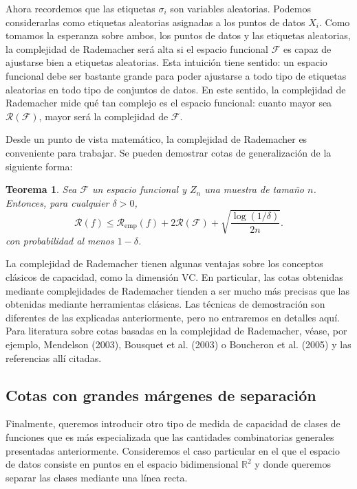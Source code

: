 \documentclass{report}
\newtheorem{thm}{Teorema}[subsection]
\begin{document}
Ahora recordemos que las etiquetas \(\sigma_i\) son variables aleatorias. Podemos considerarlas 
como etiquetas aleatorias asignadas a los puntos de datos \(X_i\). Como tomamos la esperanza sobre ambos, los 
puntos de datos y las etiquetas aleatorias, la complejidad de Rademacher será alta si el espacio funcional 
\(\mathcal{F}\) es capaz de ajustarse bien a etiquetas aleatorias. Esta intuición tiene sentido: un espacio 
funcional debe ser bastante grande para poder ajustarse a todo tipo de etiquetas aleatorias en todo tipo de 
conjuntos de datos. En este sentido, la complejidad de Rademacher mide qué tan complejo es el espacio 
funcional: cuanto mayor sea \(\mathscr{R}(\mathcal{F})\), mayor será la complejidad de \(\mathcal{F}\).\newline

Desde un punto de vista matemático, la complejidad de Rademacher es conveniente para trabajar. Se pueden 
demostrar cotas de generalización de la siguiente forma:
\begin{thm}
    Sea $\mathcal{F}$ un espacio funcional y $Z_n$ una muestra de tamaño $n$. Entonces, para cualquier $\delta > 0$,
\[
\mathcal{R}(f) \leq \mathcal{R}_{\text{emp}}(f) + 2\mathscr{R}(\mathcal{F}) + \sqrt{\frac{\log(1/\delta)}{2n}}.
\]
con probabilidad al menos \(1 - \delta\).\\
\end{thm}

La complejidad de Rademacher tienen algunas ventajas sobre los conceptos clásicos de capacidad, como la 
dimensión VC. En particular, las cotas obtenidas mediante complejidades de Rademacher tienden a ser mucho más 
precisas que las obtenidas mediante herramientas clásicas. Las técnicas de demostración son diferentes de las 
explicadas anteriormente, pero no entraremos en detalles aquí. Para literatura sobre cotas basadas en la 
complejidad de Rademacher, véase, por ejemplo, Mendelson (2003), Bousquet et al. (2003) o Boucheron et al. 
(2005) y las referencias allí citadas.

\subsection{Cotas con grandes márgenes de separación}

Finalmente, queremos introducir otro tipo de medida de capacidad de clases de funciones que es 
más especializada que las cantidades combinatorias generales presentadas anteriormente. Consideremos 
el caso particular en el que el espacio de datos consiste en puntos en el espacio bidimensional 
\(\mathbb{R}^2\) y donde queremos separar las clases mediante una línea recta. 
\end{document}
